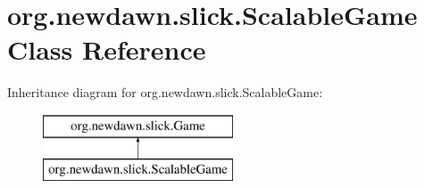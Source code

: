 \hypertarget{classorg_1_1newdawn_1_1slick_1_1_scalable_game}{}\section{org.\+newdawn.\+slick.\+Scalable\+Game Class Reference}
\label{classorg_1_1newdawn_1_1slick_1_1_scalable_game}
Inheritance diagram for org.\+newdawn.\+slick.\+Scalable\+Game\+:\begin{figure}[H]
\begin{center}
\leavevmode
\includegraphics[height=2.000000cm]{classorg_1_1newdawn_1_1slick_1_1_scalable_game}
\end{center}
\end{figure}
